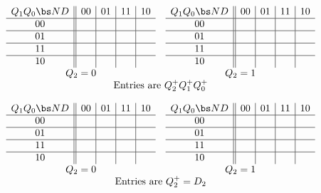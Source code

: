 \begin{description}
$$\begin{array}{cc}
\begin{array} {c||c|c|c|c}
        Q_1 Q_0 \bs ND  &  00 &  01 &  11 &  10 \\ \hline
        00              & & & &  \\ \hline
        01              & & & &  \\ \hline
        11              & & & &  \\ \hline
        10              & & & &  \\
\end{array}
&
\begin{array} {c||c|c|c|c}
        Q_1 Q_0 \bs ND  &  00 &  01 &  11 &  10 \\ \hline
        00              &  &  &  &  \\ \hline
        01              &  &  &  &  \\ \hline
        11              &  &  &  &  \\ \hline
        10              &  &  &  &  \\
\end{array} \\
Q_2=0 & Q_2=1 \\
\multicolumn{2}{c}{{\rm Entries\ are\ } Q_2^+ Q_1^+ Q_0^+}
\end{array} $$

{\tiny
$$\begin{array}{cc}
\begin{array} {c||c|c|c|c}
	Q_1 Q_0 \bs ND	& 00 & 01 & 11 & 10 \\ \hline
        00        	&    &   &   &    \\ \hline
        01        	&    &   &   &    \\ \hline
        11        	&    &   &   &   \\ \hline
        10        	&    &   &   &    \\
\end{array}
&
\begin{array} {c||c|c|c|c}
	Q_1 Q_0 \bs ND	& 00 & 01 & 11 & 10 \\ \hline
        00        	&   &   &   &   \\ \hline
        01        	&   &   &   &   \\ \hline
        11        	&   &   &   &   \\ \hline
        10        	&   &   &   &   \\
\end{array} \\
Q_2=0 & Q_2=1 \\
\multicolumn{2}{c}{{\rm Entries\ are\ } Q_2^+=D_2}
\end{array} $$

}
\end{description}

